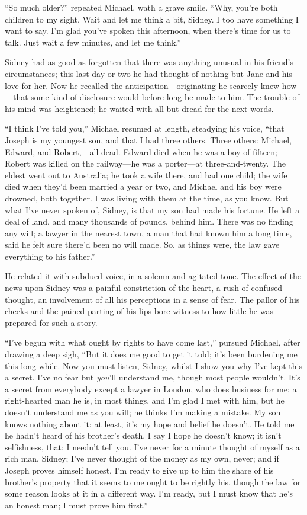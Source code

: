 ``So much older?'' repeated Michael, wath a grave smile. ``Why, you're
both children to my sight. Wait and let me think a bit, Sidney. I too
have something I want to say. I'm glad you've spoken this afternoon,
when there's time for us to talk. Just wait a few minutes, and let me
think.''

{}Sidney had as good as forgotten that there was anything unusual in his
friend's circumstances; this last day or two he had thought of nothing
but Jane and his love for her. Now he recalled the
anticipation---originating he scarcely knew how---that some kind of
disclosure would before long be made to him. The trouble of his mind was
heightened; he waited with all but dread for the next words.

``I think I've told you,'' Michael resumed at length, steadying his
voice, ``that Joseph is my youngest son, and that I had three others.
Three others: Michael, Edward, and Robert,---all dead. Edward died when
he was a boy of fifteen; Robert was killed on the railway---he was a
porter---at three-and-twenty. The eldest went out to Australia; he took
a wife there, and had one child; the wife died when they'd been married
a year or two, and Michael and his boy were drowned, both together. I
was living with them at the time, as you know. But what I've never
spoken of, Sidney, is that my son had made his fortune. He left a deal
of land, and many thousands of {}pounds, behind him. There was no
finding any will; a lawyer in the nearest town, a man that had known him
a long time, said he felt sure there'd been no will made. So, as things
were, the law gave everything to his father.''

He related it with subdued voice, in a solemn and agitated tone. The
effect of the news upon Sidney was a painful constriction of the heart,
a rush of confused thought, an involvement of all his perceptions in a
sense of fear. The pallor of his cheeks and the pained parting of his
lips bore witness to how little he was prepared for such a story.

``I've begun with what ought by rights to have come last,'' pursued
Michael, after drawing a deep sigh, ``But it does me good to get it
told; it's been burdening me this long while. Now you must listen,
Sidney, whilst I show you why I've kept this a secret. I've no fear but
\emph{you}'ll understand me, though most people wouldn't. It's a secret
from everybody except a lawyer in London, who does business for me; a
right-hearted man {}he is, in most things, and I'm glad I met with him,
but he doesn't understand me as you will; he thinks I'm making a
mistake. My son knows nothing about it: at least, it's my hope and
belief he doesn't. He told me he hadn't heard of his brother's death. I
say I hope he doesn't know; it isn't selfishness, that; I needn't tell
you. I've never for a minute thought of myself as a rich man, Sidney;
I've never thought of the money as my own, never; and if Joseph proves
himself honest, I'm ready to give up to him the share of his brother's
property that it seems to me ought to be rightly his, though the law for
some reason looks at it in a different way. I'm ready, but I must know
that he's an honest man; I must prove him first.''

